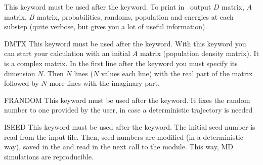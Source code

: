 \begin{keywordlist}
This keyword must be used after the  keyword. To print in \molcas\ output $D$ matrix, $A$ matrix, $B$ matrix, probabilities, randoms, population and energies at each substep (quite verbose, but gives you a lot of useful information).
\item[DMTX]
This keyword must be used after the  keyword. With this keyword you can start your calculation with an initial $A$ matrix (population density matrix). It is a complex matrix. In the first line after the keyword you must specify its dimension $N$. Then $N$ lines ($N$ values each line) with the real part of the matrix followed by $N$ more lines with the imaginary part.
\item[FRANDOM]
This keyword must be used after the  keyword. It fixes the random number to one provided by the user, in case a deterministic trajectory is needed
\item[ISEED]
This keyword must be used after the  keyword. The initial seed number is read from the input file. Then, seed numbers are modified (in a deterministic way), saved in the  and read in the next call to the module. This way, MD simulations are reproducible.

\end{keywordlist}
